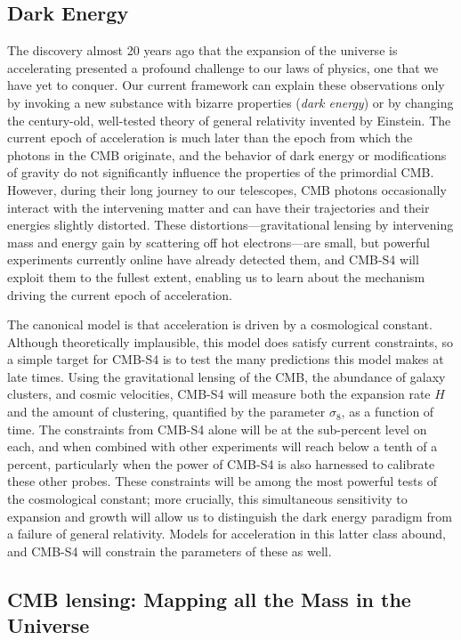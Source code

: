 \subsection*{Dark Energy}


The discovery almost 20 years ago that the expansion of the universe is accelerating presented a profound challenge to our laws of physics, one that we have yet to conquer. Our current framework can explain these observations only by invoking a new substance with bizarre properties ({\it dark energy}) or by changing the century-old, well-tested theory of general relativity invented by Einstein. The current epoch of acceleration is much later than the epoch from which the photons in the CMB originate, and the behavior of dark energy or modifications of gravity do not significantly influence the properties of the primordial CMB. However, during their long journey to our telescopes, CMB photons occasionally interact with the intervening matter and can have their trajectories and their energies slightly distorted. These distortions---gravitational lensing by intervening mass and energy gain by scattering off hot electrons---are small, but powerful experiments currently online have already detected them, and CMB-S4 will exploit them to the fullest extent, enabling us to learn about the mechanism driving the current epoch of acceleration.

The canonical model is that acceleration is driven by a cosmological constant. Although theoretically implausible, this model does satisfy current constraints, so a simple target for CMB-S4 is to test the many predictions this model makes at late times. Using the gravitational lensing of the CMB, the abundance of galaxy clusters, and cosmic velocities, CMB-S4 will measure both the expansion rate $H$ and the amount of clustering, quantified by the parameter $\sigma_8$, as a function of time. The constraints from CMB-S4 alone will be at the sub-percent level on each, and when combined with other experiments will reach below a tenth of a percent, particularly when the power of CMB-S4 is also harnessed to calibrate these other probes. These constraints will be among the most powerful tests of the cosmological constant; more crucially, this simultaneous sensitivity to expansion and growth will allow us to distinguish the dark energy paradigm from a failure of general relativity. Models for acceleration in this latter class abound, and CMB-S4 will constrain the parameters of these as well. 

\subsection*{CMB lensing: Mapping all the Mass in the Universe}


